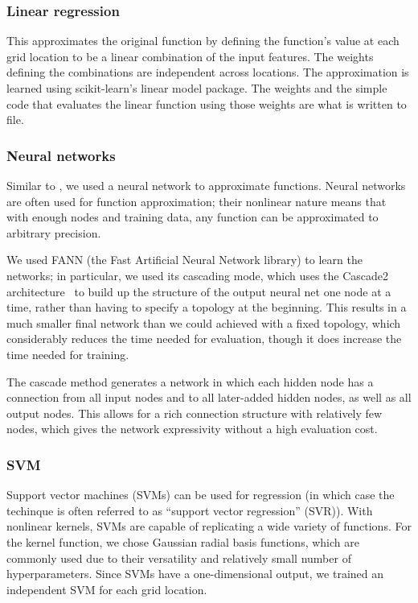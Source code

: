 \documentclass{article}
\begin{document}
\subsubsection{Linear regression}

This approximates the original function by defining the function's value at each grid location to be a linear combination of the input features. The weights defining the combinations are independent across locations. The approximation is learned using scikit-learn's linear model package. The weights and the simple code that evaluates the linear function using those weights are what is written to file.

\subsubsection{Neural networks}

Similar to \cite{Esmaeilzadeh12}, we used a neural network to approximate functions. Neural networks are often used for function approximation; their nonlinear nature means that with enough nodes and training data, any function can be approximated to arbitrary precision.

We used FANN (the Fast Artificial Neural Network library) to learn the networks; in particular, we used its cascading mode, which uses the Cascade2 architecture~\cite{fahlman} to build up the structure of the output neural net one node at a time, rather than having to specify a topology at the beginning. This results in a much smaller final network than we could achieved with a fixed topology, which considerably reduces the time needed for evaluation, though it does increase the time needed for training.

The cascade method generates a network in which each hidden node has a connection from all input nodes and to all later-added hidden nodes, as well as all output nodes. This allows for a rich connection structure with relatively few nodes, which gives the network expressivity without a high evaluation cost.

\subsubsection{SVM}

Support vector machines (SVMs) can be used for regression (in which case the techinque is often referred to as ``support vector regression'' (SVR)). With nonlinear kernels, SVMs are capable of replicating a wide variety of functions. For the kernel function, we chose Gaussian radial basis functions, which are commonly used due to their versatility and relatively small number of hyperparameters. Since SVMs have a one-dimensional output, we trained an independent SVM for each grid location.
\end{document}
